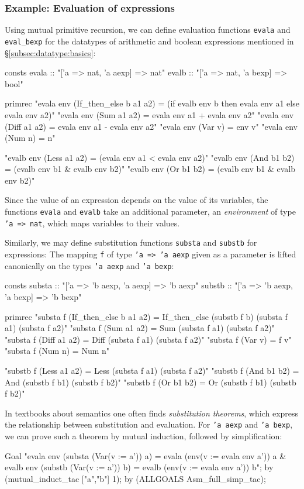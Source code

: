 \subsubsection{Example: Evaluation of expressions}
Using mutual primitive recursion, we can define evaluation functions \texttt{evala}
and \texttt{eval_bexp} for the datatypes of arithmetic and boolean expressions mentioned in
{\S}\ref{subsec:datatype:basics}:
\begin{ttbox}
consts
  evala :: "['a => nat, 'a aexp] => nat"
  evalb :: "['a => nat, 'a bexp] => bool"

primrec
  "evala env (If_then_else b a1 a2) =
     (if evalb env b then evala env a1 else evala env a2)"
  "evala env (Sum a1 a2) = evala env a1 + evala env a2"
  "evala env (Diff a1 a2) = evala env a1 - evala env a2"
  "evala env (Var v) = env v"
  "evala env (Num n) = n"

  "evalb env (Less a1 a2) = (evala env a1 < evala env a2)"
  "evalb env (And b1 b2) = (evalb env b1 & evalb env b2)"
  "evalb env (Or b1 b2) = (evalb env b1 & evalb env b2)"
\end{ttbox}
Since the value of an expression depends on the value of its variables,
the functions \texttt{evala} and \texttt{evalb} take an additional
parameter, an {\em environment} of type \texttt{'a => nat}, which maps
variables to their values.

Similarly, we may define substitution functions \texttt{substa}
and \texttt{substb} for expressions: The mapping \texttt{f} of type
\texttt{'a => 'a aexp} given as a parameter is lifted canonically
on the types \texttt{'a aexp} and \texttt{'a bexp}:
\begin{ttbox}
consts
  substa :: "['a => 'b aexp, 'a aexp] => 'b aexp"
  substb :: "['a => 'b aexp, 'a bexp] => 'b bexp"

primrec
  "substa f (If_then_else b a1 a2) =
     If_then_else (substb f b) (substa f a1) (substa f a2)"
  "substa f (Sum a1 a2) = Sum (substa f a1) (substa f a2)"
  "substa f (Diff a1 a2) = Diff (substa f a1) (substa f a2)"
  "substa f (Var v) = f v"
  "substa f (Num n) = Num n"

  "substb f (Less a1 a2) = Less (substa f a1) (substa f a2)"
  "substb f (And b1 b2) = And (substb f b1) (substb f b2)"
  "substb f (Or b1 b2) = Or (substb f b1) (substb f b2)"
\end{ttbox}
In textbooks about semantics one often finds {\em substitution theorems},
which express the relationship between substitution and evaluation. For
\texttt{'a aexp} and \texttt{'a bexp}, we can prove such a theorem by mutual
induction, followed by simplification:
\begin{ttbox}
Goal
  "evala env (substa (Var(v := a')) a) =
     evala (env(v := evala env a')) a &
   evalb env (substb (Var(v := a')) b) =
     evalb (env(v := evala env a')) b";
by (mutual_induct_tac ["a","b"] 1);
by (ALLGOALS Asm_full_simp_tac);
\end{ttbox}

